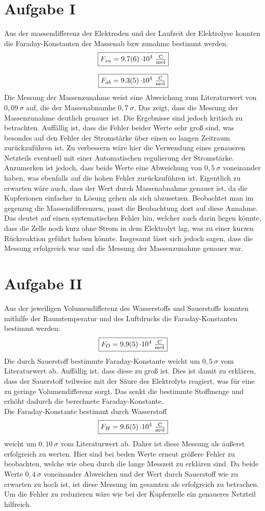 \section{Aufgabe I}

Aus der massendifferenz der Elektroden und der Laufzeit der Elektrolyse konnten die Faraday-Konstanten der Massenab bzw zunahme bestimmt werden.
\[\boxed{F_{zu} = \SI{9,7\pm 0,6}{\cdot 10^{4}\ \tfrac{\coulomb}{\mole}}}\]

\[\boxed{F_{ab} = \SI{9,3\pm 0,5}{\cdot 10^{4}\ \tfrac{\coulomb}{\mole}}}\]
Die Messung der Massenzunahme weist eine Abweichung zum Literaturwert von $0,09\ \sigma$ auf, die der Massenabnamhe $0,7\ \sigma$.
Das zeigt, dass die Messung der Massenzunahme deutlich genauer ist. Die Ergebnisse sind jedoch kritisch zu betrachten.
Auffällig ist, dass die Fehler beider Werte sehr groß sind, was besondes auf den Fehler der Stromstärke über einen so langen Zeitraum zurückzuführen ist.
Zu verbessern wäre hier die Verwendung eines genaueren Netzteils eventuell mit einer Automatischen regulierung der Stromstärke. \\
Anzumerken ist jedoch, dass beide Werte eine Abweichung von $0,5\ \sigma$ voneinander haben, was ebenfalls auf die hohen Fehler zurückzuführen ist.
Eigentlich zu erwarten wäre auch, dass der Wert durch Massenabnahme genauer ist, da die Kupferionen einfacher in Lösung gehen als sich abzusetzen.
Beobachtet man im gegenzug die Massendifferenzen, passt die Beobachtung dort auf diese Annahme. Das deutet auf einen systematischen Fehler hin, welcher
auch darin liegen könnte, dass die Zelle noch kurz ohne Strom in dem Elektrolyt lag, was zu einer kurzen Rückreaktion geführt haben könnte.
Insgesamt lässt sich jedoch sagen, dass die Messung erfolgreich war und die Messung der Massenzunahme genauer war.

\section{Aufgabe II}

Aus der jeweiligen Volumendifferenz des Wasserstoffs und Sauerstoffs konnten mithilfe der Raumtemperatur und des Luftdrucks die Faraday-Konstanten bestimmt werden:
\[\boxed{F_O = \SI{9,9\pm 0,5}{\cdot 10^{4}\ \tfrac{\coulomb}{\mole}}}\]
Die durch Sauerstoff bestimmte Faraday-Konstante weicht um $0,5\ \sigma$ vom Literaturwert ab. Auffällig ist, dass diese zu groß ist.
Dies ist damit zu erklären, dass der Sauerstoff teilweise mit der Säure des Elektrolyts reagiert, was für eine zu geringe Volumendifferenz sorgt.
Das senkt die bestimmte Stoffmenge und erhöht dadurch die berechnete Faraday-Konstante.\\
Die Faraday-Konstante bestimmt durch Wasserstoff
\[\boxed{F_H = \SI{9,6\pm 0,5}{\cdot 10^{4}\ \tfrac{\coulomb}{\mole}}}\]
weicht um $0,10\ \sigma$ vom Literaturwert ab. Daher ist diese Messung als äußerst erfolgreich zu werten.
Hier sind bei beden Werte erneut größere Fehler zu beobachten, welche wie oben durch die lange Messzeit zu erklären sind.
Da beide Werte $0,4\ \sigma$ voneinander Abweichen und der Wert durch Sauerstoff wie zu erwarten zu hoch ist, ist diese Messung im gesamten als erfolgreich zu betrachen.
Um die Fehler zu reduzieren wäre wie bei der Kupferzelle ein genaueres Netzteil hilfreich.

